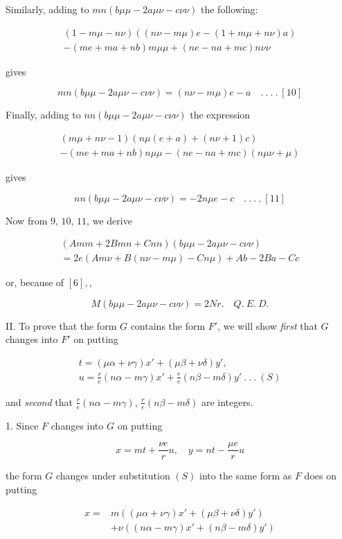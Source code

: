 Similarly, adding to $mn(b\mu\mu-2a\mu\nu-c\nu\nu)$ the following:


\[
\begin{gathered}(1-m\mu-n\nu)((n\nu-m\mu)e-(1+m\mu+n\nu)a)\\-(me+ma+nb)m\mu\mu+(ne-na+mc)n\nu\nu\end{gathered}
\]

gives

\[
mn(b\mu\mu-2a\mu\nu-c\nu\nu)=(n\nu-m\mu)e-a\quad .\ .\ .\ .\ [10]
\]

Finally, adding to $nn(b\mu\mu-2a\mu\nu-c\nu\nu)$ the expression

\[
\begin{gathered}(m\mu+n\nu-1)(n\mu(e+a)+(n\nu+1)c)\\-(me+ma+nb)n\mu\mu-(ne-na+mc)(n\mu\nu+\mu)\end{gathered}
\]

gives

\[
nn(b\mu\mu-2a\mu\nu-c\nu\nu)=-2n\mu e-c\quad .\ .\ .\ .\ [11]
\]

Now from $9$, $10$, $11$, we derive

\[
\begin{gathered}(Amm+2Bmn+Cnn)(b\mu\mu-2a\mu\nu-c\nu\nu)\\=2e(Am\nu+B(n\nu-m\mu)-Cn\mu)+Ab-2Ba-Cc\end{gathered}
\]

or, because of $[6],$,

\[
M(b\mu\mu-2a\mu\nu-c\nu\nu)=2Nr.\quad Q.\ E.\ D.
\]

II. To prove that the form $G$ contains the form $F'$, we will show \emph{first} that $G$ changes into $F'$ on putting

\[
\begin{gathered}t=(\mu\alpha+\nu\gamma)x'+(\mu\beta+\nu\delta)y',\\u=\frac re(n\alpha-m\gamma)x'+\frac re(n\beta-m\delta)y'\ .\ .\ .\ (S)\end{gathered}
\]

and \emph{second} that $\frac{r}{e}(n\alpha-m\gamma)$, $\frac{r}{e}(n\beta-m\delta)$ are integers.

1. Since $F$ changes into $G$ on putting

\[
x=mt+\frac{\nu e}{r}u,\quad y=nt-\frac{\mu e}{r}u
\]

the form $G$ changes under substitution $(S)$ into the same form as $F$ does on putting

\[
\begin{aligned}x={}&m((\mu\alpha+\nu\gamma)x'+(\mu\beta+\nu\delta)y')\\&+\nu((n\alpha-m\gamma)x'+(n\beta-m\delta)y')\end{aligned}
\]

